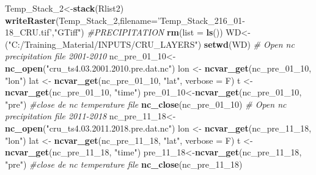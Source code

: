 \documentclass[
  10pt,
  b5paper,
]{book}
\newenvironment{Shaded}{\begin{snugshade}}{\end{snugshade}}
\newcommand{\CommentTok}[1]{\textcolor[rgb]{0.56,0.35,0.01}{\textit{#1}}}
\newcommand{\DataTypeTok}[1]{\textcolor[rgb]{0.13,0.29,0.53}{#1}}
\newcommand{\DecValTok}[1]{\textcolor[rgb]{0.00,0.00,0.81}{#1}}
\newcommand{\KeywordTok}[1]{\textcolor[rgb]{0.13,0.29,0.53}{\textbf{#1}}}
\newcommand{\NormalTok}[1]{#1}
\newcommand{\StringTok}[1]{\textcolor[rgb]{0.31,0.60,0.02}{#1}}
\begin{document}
\begin{Shaded}
\begin{Highlighting}[]
\NormalTok{Temp_Stack_}\DecValTok{2}\NormalTok{<-}\KeywordTok{stack}\NormalTok{(Rlist2)}
\KeywordTok{writeRaster}\NormalTok{(Temp_Stack_}\DecValTok{2}\NormalTok{,}\DataTypeTok{filename=}\StringTok{'Temp_Stack_216_01-18_CRU.tif'}\NormalTok{,}\StringTok{"GTiff"}\NormalTok{) }
 \CommentTok{#PRECIPITATION}
 \KeywordTok{rm}\NormalTok{(}\DataTypeTok{list =} \KeywordTok{ls}\NormalTok{())}
\NormalTok{WD<-(}\StringTok{"C:/Training_Material/INPUTS/CRU_LAYERS"}\NormalTok{)}
\KeywordTok{setwd}\NormalTok{(WD)}
 \CommentTok{# Open nc precipitation file 2001-2010}
\NormalTok{nc_pre_}\DecValTok{01}\NormalTok{_}\DecValTok{10}\NormalTok{<-}\KeywordTok{nc_open}\NormalTok{(}\StringTok{"cru_ts4.03.2001.2010.pre.dat.nc"}\NormalTok{)}
\NormalTok{ lon <-}\StringTok{ }\KeywordTok{ncvar_get}\NormalTok{(nc_pre_}\DecValTok{01}\NormalTok{_}\DecValTok{10}\NormalTok{, }\StringTok{"lon"}\NormalTok{)}
\NormalTok{lat <-}\StringTok{ }\KeywordTok{ncvar_get}\NormalTok{(nc_pre_}\DecValTok{01}\NormalTok{_}\DecValTok{10}\NormalTok{, }\StringTok{"lat"}\NormalTok{, }\DataTypeTok{verbose =}\NormalTok{ F)}
\NormalTok{t <-}\StringTok{ }\KeywordTok{ncvar_get}\NormalTok{(nc_pre_}\DecValTok{01}\NormalTok{_}\DecValTok{10}\NormalTok{, }\StringTok{"time"}\NormalTok{)}
\NormalTok{ pre_}\DecValTok{01}\NormalTok{_}\DecValTok{10}\NormalTok{<-}\KeywordTok{ncvar_get}\NormalTok{(nc_pre_}\DecValTok{01}\NormalTok{_}\DecValTok{10}\NormalTok{, }\StringTok{"pre"}\NormalTok{)}
 \CommentTok{#close de nc temperature file}
 \KeywordTok{nc_close}\NormalTok{(nc_pre_}\DecValTok{01}\NormalTok{_}\DecValTok{10}\NormalTok{) }
 \CommentTok{# Open nc precipitation file 2011-2018}
\NormalTok{nc_pre_}\DecValTok{11}\NormalTok{_}\DecValTok{18}\NormalTok{<-}\KeywordTok{nc_open}\NormalTok{(}\StringTok{"cru_ts4.03.2011.2018.pre.dat.nc"}\NormalTok{)}
\NormalTok{ lon <-}\StringTok{ }\KeywordTok{ncvar_get}\NormalTok{(nc_pre_}\DecValTok{11}\NormalTok{_}\DecValTok{18}\NormalTok{, }\StringTok{"lon"}\NormalTok{)}
\NormalTok{lat <-}\StringTok{ }\KeywordTok{ncvar_get}\NormalTok{(nc_pre_}\DecValTok{11}\NormalTok{_}\DecValTok{18}\NormalTok{, }\StringTok{"lat"}\NormalTok{, }\DataTypeTok{verbose =}\NormalTok{ F)}
\NormalTok{t <-}\StringTok{ }\KeywordTok{ncvar_get}\NormalTok{(nc_pre_}\DecValTok{11}\NormalTok{_}\DecValTok{18}\NormalTok{, }\StringTok{"time"}\NormalTok{)}
\NormalTok{ pre_}\DecValTok{11}\NormalTok{_}\DecValTok{18}\NormalTok{<-}\KeywordTok{ncvar_get}\NormalTok{(nc_pre_}\DecValTok{11}\NormalTok{_}\DecValTok{18}\NormalTok{, }\StringTok{"pre"}\NormalTok{)}
 \CommentTok{#close de nc temperature file}
 \KeywordTok{nc_close}\NormalTok{(nc_pre_}\DecValTok{11}\NormalTok{_}\DecValTok{18}\NormalTok{) }

\end{Highlighting}
\end{Shaded}
\end{document}
